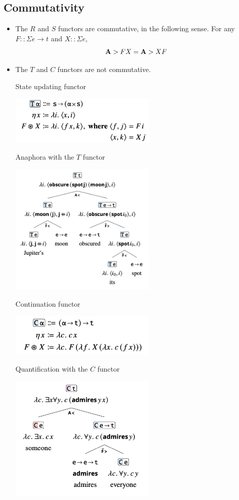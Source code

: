 \documentclass{article}
\begin{document}
\subsection{Commutativity}

\begin{itemize}
  \item The $R$ and $S$ functors are commutative, in the following sense. For any $F :: \Sigma e \to t$ and $X :: \Sigma e$,
    \[ {\bf A} > F X = {\bf A} > X F \]
  \item The $T$ and $C$ functors are not commutative. 
    \begin{exe}
      \ex State updating functor \hfill \begin{center}
        \includegraphics[width=7cm]{clips/44.png}
      \end{center}
      \ex Anaphora with the $T$ functor \hfill \begin{center}
        \includegraphics[width=7cm]{clips/46.png}
      \end{center}
      \ex Continuation functor \hfill \begin{center}
        \includegraphics[width=7cm]{clips/45.png}
      \end{center}
      \ex Quantification with the $C$ functor \hfill \begin{center}
        \includegraphics[width=7cm]{clips/47.png}
      \end{center}
    \end{exe}
\end{itemize}

\pagebreak


\end{document}

